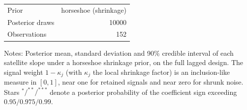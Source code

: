 \begin{table}[!htbp]
\begin{tabular}{lrrrr}
\midrule
Prior & \multicolumn{4}{r}{horseshoe (shrinkage)} \\
Posterior draws & \multicolumn{4}{r}{10000} \\
Observations & \multicolumn{4}{r}{152} \\
\bottomrule
\end{tabular}
\begin{tablenotes}\small
\item Notes: Posterior mean, standard deviation and 90\% credible interval of each satellite slope under a horseshoe shrinkage prior, on the full lagged design. The signal weight $1-\kappa_j$ (with $\kappa_j$ the local shrinkage factor) is an inclusion-like measure in $[0,1]$, near one for retained signals and near zero for shrunk noise. Stars $^{*}/^{**}/^{***}$ denote a posterior probability of the coefficient sign exceeding $0.95/0.975/0.99$.
\end{tablenotes}
\end{table}
